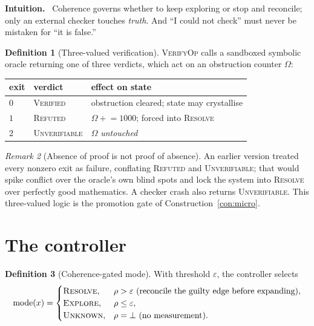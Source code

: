 \documentclass[11pt]{article}
\theoremstyle{definition}
\newtheorem{definition}{Definition}[section]
\theoremstyle{plain}
\theoremstyle{remark}
\newtheorem{remark}[definition]{Remark}
\newcommand{\Intu}{\noindent\textbf{\color{intuitioncol}Intuition.}\ }
\begin{document}
\begin{intu}\Intu
Coherence governs whether to keep exploring or stop and reconcile; only an external
checker touches \emph{truth}. And ``I could not check'' must never be mistaken for
``it is false.''
\end{intu}

\begin{definition}[Three-valued verification]
\textsc{VerifyOp} calls a sandboxed symbolic oracle returning one of three verdicts,
which act on an obstruction counter $\Omega$:
\begin{center}
\renewcommand{\arraystretch}{1.2}
\begin{tabular}{@{}lll@{}}
\hline
exit & verdict & effect on state\\
\hline
$0$ & \textsc{Verified} & obstruction cleared; state may crystallise\\
$1$ & \textsc{Refuted} & $\Omega\mathrel{+}=1000$; forced into \textsc{Resolve}\\
$2$ & \textsc{Unverifiable} & $\Omega$ \emph{untouched}\\
\hline
\end{tabular}
\end{center}
\end{definition}

\begin{remark}[Absence of proof is not proof of absence]
An earlier version treated every nonzero exit as failure, conflating \textsc{Refuted}
and \textsc{Unverifiable}; that would spike conflict over the oracle's own blind spots
and lock the system into \textsc{Resolve} over perfectly good mathematics. A checker
crash also returns \textsc{Unverifiable}. This three-valued logic is the promotion
gate of Construction~\ref{con:micro}.
\end{remark}

\section{The controller}\label{sec:controller}

\begin{definition}[Coherence-gated mode]
With threshold $\varepsilon$, the controller selects
\begin{equation}
\text{mode}(x)=
\begin{cases}
\textsc{Resolve}, & \rho>\varepsilon\ \text{(reconcile the guilty edge before expanding)},\\
\textsc{Explore}, & \rho\le\varepsilon,\\
\textsc{Unknown}, & \rho=\bot\ \text{(no measurement)}.
\end{cases}
\end{equation}
\end{definition}
\end{document}
